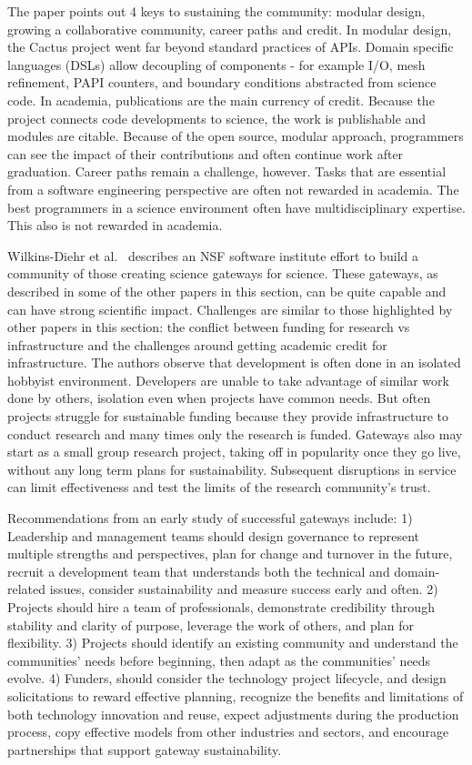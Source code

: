 \documentclass[11pt, oneside]{amsart}
\begin{document}
The paper points out 4 keys to sustaining the community: modular design,
growing a collaborative community, career paths and credit. In modular design,
the Cactus project went far beyond standard practices of APIs. Domain specific
languages (DSLs) allow decoupling of components - for example I/O, mesh
refinement, PAPI counters, and boundary conditions abstracted from science
code. In academia, publications are the main currency of credit. Because the
project connects code developments to science, the work is publishable and
modules are citable. Because of the open source, modular approach, programmers
can see the impact of their contributions and often continue work after
graduation. Career paths remain a challenge, however. Tasks that are essential
from a software engineering perspective are often not rewarded in academia. The
best programmers in a science environment often have multidisciplinary
expertise. This also is not rewarded in academia.

Wilkins-Diehr et al.~\cite{Wilkins-Diehr_WSSSPE} describes an NSF software institute effort to build a
community of those creating science gateways for science. These
gateways, as described in some of the other papers in this section, can be
quite capable and can have strong scientific impact.
Challenges are similar to those highlighted by other papers in this section:
the conflict between funding for research vs infrastructure and the
challenges around getting academic credit for infrastructure. 
%
The authors observe that  development is
often done in an isolated hobbyist environment. Developers are unable to take
advantage of similar work done by others, isolation even when projects have
common needs. But often projects struggle for sustainable funding because they
provide infrastructure to conduct research and many times only the research is
funded. Gateways also may start as a small group research project, taking off in
popularity once they go live, without any long term plans for sustainability.
Subsequent disruptions in
service can limit effectiveness and test the limits of the research community's
trust. %

Recommendations from an early study of successful gateways include:
1) Leadership and management teams should design governance to
represent multiple strengths and perspectives, plan for change and turnover in
the future, recruit a development team that understands both the technical and
domain-related issues, consider sustainability and measure success early and
often. 2) Projects should hire a team of
professionals, demonstrate credibility through stability and clarity of
purpose, leverage the work of others, and plan for flexibility. 3) Projects should
identify an existing community and understand the communities' needs
before beginning, then adapt as the communities' needs evolve. 4) Funders,
should consider the technology project lifecycle, and design solicitations 
to reward effective planning, recognize the benefits and
limitations of both technology innovation and reuse, expect adjustments during
the production process, copy effective models from other industries and
sectors, and encourage partnerships that support gateway sustainability.
\end{document}

